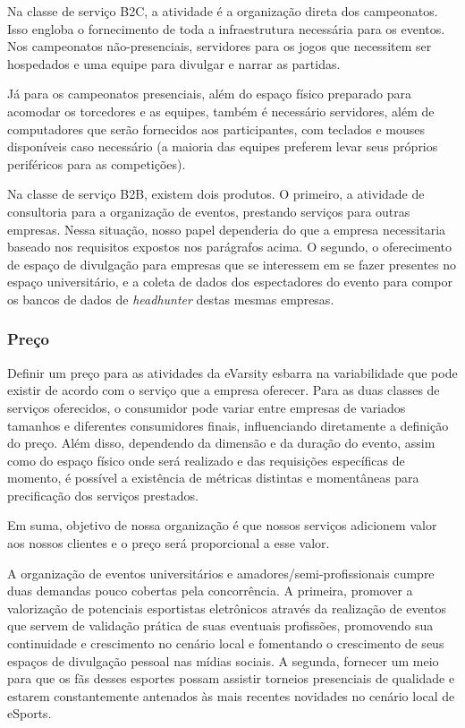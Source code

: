 \documentclass[a4paper, 12pt]{paper}
\begin{document}
Na classe de serviço B2C, a atividade é a organização direta dos campeonatos. Isso engloba o fornecimento de toda a infraestrutura necessária para os eventos. Nos campeonatos não-presenciais, servidores para os jogos que necessitem ser hospedados e uma equipe para divulgar e narrar as partidas.

Já para os campeonatos presenciais, além do espaço físico preparado para acomodar os torcedores e as equipes, também é necessário servidores, além de computadores que serão fornecidos aos participantes, com teclados e mouses disponíveis caso necessário (a maioria das equipes preferem levar seus próprios periféricos para as competições).

Na classe de serviço B2B, existem dois produtos. O primeiro, a atividade de consultoria para a organização de eventos, prestando serviços para outras empresas. Nessa situação, nosso papel dependeria do que a empresa necessitaria baseado nos requisitos expostos nos parágrafos acima. O segundo, o oferecimento de espaço de divulgação para empresas que se interessem em se fazer presentes no espaço universitário, e a coleta de dados dos espectadores do evento para compor os bancos de dados de \textit{headhunter} destas mesmas empresas.
\subsubsection{Preço}
Definir um preço para as atividades da eVarsity esbarra na variabilidade que pode existir de acordo com o serviço que a empresa oferecer. Para as duas classes de serviços oferecidos, o consumidor pode variar entre empresas de variados tamanhos e diferentes consumidores finais, influenciando diretamente a definição do preço. Além disso, dependendo da dimensão e da duração do evento, assim como do espaço físico onde será realizado e das requisições específicas de momento, é possível a existência de métricas distintas e momentâneas para precificação dos serviços prestados.

Em suma, objetivo de nossa organização é que nossos serviços adicionem valor aos nossos clientes e o preço será proporcional a esse valor.

A organização de eventos universitários e amadores/semi-profissionais cumpre duas demandas pouco cobertas pela concorrência. A primeira, promover a valorização de potenciais esportistas eletrônicos através da realização de eventos que servem de validação prática de suas eventuais profissões, promovendo sua continuidade e crescimento no cenário local e fomentando o crescimento de seus espaços de divulgação pessoal nas mídias sociais. A segunda, fornecer um meio para que os fãs desses esportes possam assistir torneios presenciais de qualidade e estarem constantemente antenados às mais recentes novidades no cenário local de eSports.
\end{document}
